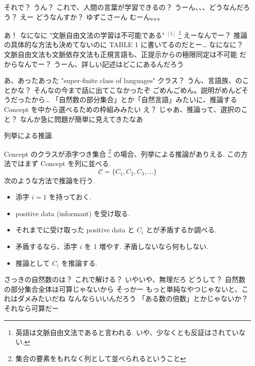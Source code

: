 \PAUSE

\YUKARI それで？
\YUZUKO うん？
\YUKARI これで、人間の言葉が学習できるの？
\YUZUKO うーん、、、どうなんだろう？
\YUKARI えー
\YUI どうなんすか？ ゆずこさーん
\YUZUKO むーん。。。

\PAUSE

\YUZUKO あ！
\YUI なになに
\YUZUKO "文脈自由文法の学習は不可能である" ${}^{[1]}$ \footnote{英語は文脈自由文法であると言われる. いや、少なくとも反証はされていない.}
\YUKARI えーなんでー？
\YUI 推論の具体的な方法も決めてないのに
\YUZUKO TABLE 1 に書いてるのだとー…
\YUI なになに？
\YUZUKO 文脈自由文法も文脈依存文法も正規言語も、正提示からの極限同定は不可能
\YUKARI だからなんでー？
\YUZUKO うーん、詳しい記述はどこにあるんだろう

\PAUSE

\YUZUKO あ、あったあった
\YUZUKO "super-finite class of languages"
\YUKARI クラス？
\YUZUKO うん、言語族、のことかな？
\YUI そんなの今まで話に出てこなかったぞ
\YUZUKO ごめんごめん。説明がめんどそうだったから…
\YUZUKO 「自然数の部分集合」とか「自然言語」みたいに、推論するConcept を中から選べるための枠組みみたい
\YUKARI え？ じゃあ、推論って、選択のこと？
\YUI なんか急に問題が簡単に見えてきたなあ

\begin{boxnote}
    列挙による推論.

    Cencept のクラスが添字つき集合 \footnote{集合の要素をもれなく列として並べられるということ} の場合、列挙による推論がありえる. この方法ではまず Concept を列に並べる.
    $$\mathcal{C} = \{ C_1, C_2, C_3, \ldots \}$$
    次のような方法で推論を行う.
    \begin{itemize}
        \setlength{\itemsep}{0mm}
        \item
            添字 $i=1$ を持っておく.
        \item
            positive data (informant) を受け取る.
        \item
            それまでに受け取った positive data と $C_i$ とが矛盾するか調べる.
        \item
            矛盾するなら、添字 $i$ を 1 増やす.
            矛盾しないなら何もしない.
        \item
            推論として $C_i$ を推論する.
    \end{itemize}
\end{boxnote}

\YUKARI さっきの自然数のは？ これで解ける？
\YUI いやいや、無理だろ
\YUKARI どうして？
\YUI 自然数の部分集合全体は可算じゃないから
\YUKARI そっかー
\YUZUKO もっと単純なやつじゃないと、これはダメみたいだね
\YUKARI なんならいいんだろう
\YUI 「ある数の倍数」とかじゃないか？
\YUKARI それなら可算だー

